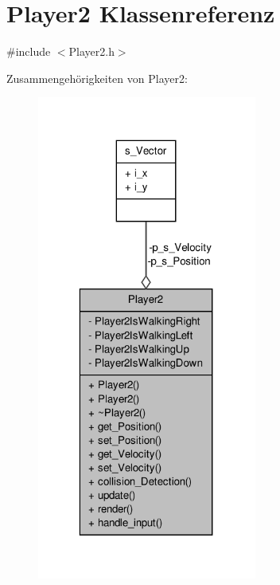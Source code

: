 \hypertarget{class_player2}{\section{Player2 Klassenreferenz}
\label{class_player2}
}


{\ttfamily \#include $<$Player2.\-h$>$}



Zusammengehörigkeiten von Player2\-:
\nopagebreak
\begin{figure}[H]
\begin{center}
\leavevmode
\includegraphics[width=205pt]{class_player2__coll__graph}
\end{center}
\end{figure}

